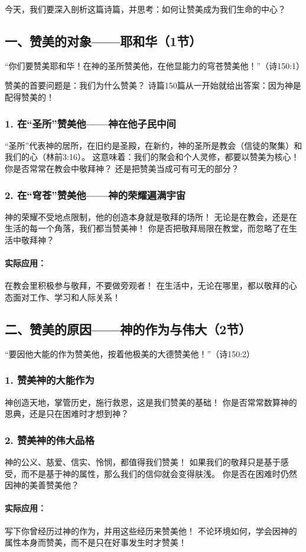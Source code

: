 \documentclass[a4paper, 12pt]{article}
\begin{document}
今天，我们要深入剖析这篇诗篇，并思考：如何让赞美成为我们生命的中心？

\subsection*{一、赞美的对象——耶和华（1节）}
“你们要赞美耶和华！在神的圣所赞美他，在他显能力的穹苍赞美他！”（诗150:1）

赞美的首要问题是：我们为什么赞美？ 诗篇150篇从一开始就给出答案：因为神是配得赞美的！

\subsubsection*{1. 在“圣所”赞美他——神在他子民中间}
“圣所”代表神的居所，在旧约是圣殿，在新约，神的圣所是教会（信徒的聚集）和我们的心（林前3:16）。
这意味着：我们的聚会和个人灵修，都要以赞美为核心！
你是否常常在教会中敬拜神？ 还是把赞美当成可有可无的部分？
\subsubsection*{2. 在“穹苍”赞美他——神的荣耀遍满宇宙}
神的荣耀不受地点限制，他的创造本身就是敬拜的场所！
无论是在教会，还是在生活的每一个角落，我们都当赞美神！
你是否把敬拜局限在教堂，而忽略了在生活中敬拜神？
\paragraph*{实际应用：}
在教会里积极参与敬拜，不要做旁观者！
在生活中，无论在哪里，都以敬拜的心态面对工作、学习和人际关系！
\subsection*{二、赞美的原因——神的作为与伟大（2节）}
“要因他大能的作为赞美他，按着他极美的大德赞美他！”（诗150:2）

\subsubsection*{1. 赞美神的大能作为}
神创造天地，掌管历史，施行救恩，这是我们赞美的基础！
你是否常常数算神的恩典，还是只在困难时才想到神？
\subsubsection*{2. 赞美神的伟大品格}
神的公义、慈爱、信实、怜悯，都值得我们赞美！
如果我们的敬拜只是基于感受，而不是基于神的属性，那么我们的信仰就会变得肤浅。
你是否在困难时仍然因神的美善赞美他？
\paragraph*{实际应用：}
写下你曾经历过神的作为，并用这些经历来赞美他！
不论环境如何，学会因神的属性本身而赞美，而不是只在好事发生时才赞美！
\end{document}
